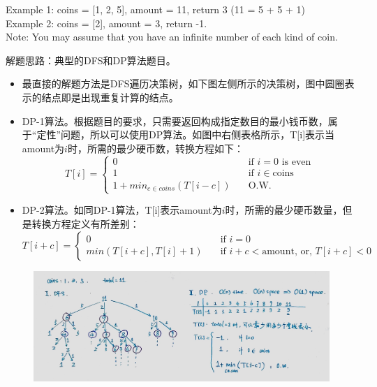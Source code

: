 \documentclass[a4paper,10pt]{article}
\begin{document}
\noindent Example 1: coins = [1, 2, 5], amount = 11, return 3 (11 = 5 + 5 + 1) \\

\noindent Example 2: coins = [2], amount = 3, return -1. \\

\noindent Note: You may assume that you have an infinite number of each kind of coin. \\

\begin{CJK*}{UTF8}{gbsn}
\noindent 解题思路：典型的DFS和DP算法题目。
\begin{itemize}
    \item 最直接的解题方法是DFS遍历决策树，如下图左侧所示的决策树，图中圆圈表示的结点即是出现重复计算的结点。
    
    \item DP-1算法。根据题目的要求，只需要返回构成指定数目的最小钱币数，属于“定性”问题，所以可以使用DP算法。如图中右侧表格所示，T[i]表示当amount为$i$时，所需的最少硬币数，转换方程如下：
    \[ T[i] =
      \begin{cases}
        0 & \quad \text{if } i=0 \text{ is even}\\
        1  & \quad \text{if } i \in \text{coins}\\
        1 + min_{c\in coins}(T[i-c])  & \quad \text{O.W. }
      \end{cases}
    \]
    
    \item DP-2算法。如同DP-1算法，T[i]表示amount为$i$时，所需的最少硬币数量，但是转换方程定义有所差别：
    \[ T[i+c] =
      \begin{cases}
        0 & \quad \text{if } i=0\\
        min(T[i+c], T[i]+1)  & \quad \text{if } i+c<\text{amount, or, } T[i+c]<0
      \end{cases}
    \]
\end{itemize}
\end{CJK*}

\begin{figure}[h]
    \includegraphics[width=\textwidth]{leetcode322.jpg}
    \centering\\
\end{figure}
\end{document}
